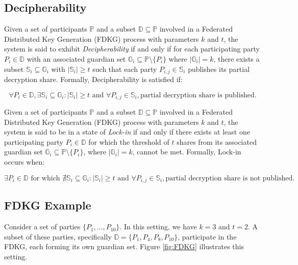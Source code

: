 \documentclass{article}
\begin{document}
\subsection*{Decipherability}
\begin{definition}[Decipherability] \label{def:decipherability}
    Given a set of participants $\mathbb{P}$ and a subset $\mathbb{D} \subseteq \mathbb{P}$ involved in a Federated Distributed Key Generation (FDKG) process with parameters $k$ and $t$, the system is said to exhibit \textit{Decipherability} if and only if for each participating party $P_i \in \mathbb{D}$ with an associated guardian set $\mathbb{G}_i \subseteq \mathbb{P} \setminus \{P_i\}$ where $|\mathbb{G}_i| = k$, there exists a subset $\mathbb{S}_i \subseteq \mathbb{G}_i$ with $|\mathbb{S}_i| \geq t$ such that each party $P_{i,j} \in \mathbb{S}_i$ publishes its partial decryption share. Formally, Decipherability is satisfied if:

    \[
    \forall P_i \in \mathbb{D}, \exists \mathbb{S}_i \subseteq \mathbb{G}_i : |\mathbb{S}_i| \geq t \text{ and } \forall P_{i,j} \in \mathbb{S}_i, \text{partial decryption share is published}.
    \]
\end{definition}

\begin{definition}[Lock-in] \label{def:lock-in}
    Given a set of participants $\mathbb{P}$ and a subset $\mathbb{D} \subseteq \mathbb{P}$ involved in a Federated Distributed Key Generation (FDKG) process with parameters $k$ and $t$, the system is said to be in a state of \textit{Lock-in} if and only if there exists at least one participating party $P_i \in \mathbb{D}$ for which the threshold of $t$ shares from its associated guardian set $\mathbb{G}_i \subseteq \mathbb{P} \setminus \{P_i\}$, where $|\mathbb{G}_i| = k$, cannot be met. Formally, Lock-in occurs when:

    \[
    \exists P_i \in \mathbb{D} \text{ for which } \nexists \mathbb{S}_i \subseteq \mathbb{G}_i : |\mathbb{S}_i| \geq t \text{ and } \forall P_{i,j} \in \mathbb{S}_i, \text{partial decryption share is not published}.
    \]
\end{definition}


\subsection*{FDKG Example}

Consider a set of parties $\{P_1, \ldots, P_{10}\}$. In this setting, we have $k = 3$ and $t = 2$. A subset of these parties, specifically $\mathbb{D} = \{P_1, P_4, P_8, P_{10}\}$, participate in the FDKG, each forming its own guardian set. Figure \ref{fig:FDKG} illustrates this setting.
\end{document}

